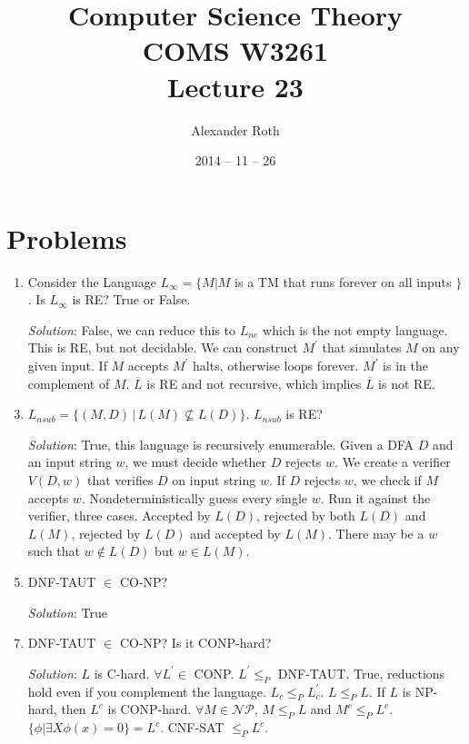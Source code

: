 \documentclass[]{article}
\begin{document}
\newtheorem{thm}{Theorem}
\title{Computer Science Theory \\ COMS W3261 \\ Lecture 23}
\author{Alexander Roth}
\date{2014 -- 11 -- 26}
\maketitle

\section*{Problems}
\begin{enumerate}
\item Consider the Language $L_\infty = \{ M | M$ is a TM that runs forever on all inputs $\}$. Is $L_\infty$ is RE? True or False. 
\item[\emph{Solution}:] False, we can reduce this to $L_{ne}$ which is the not empty language. This is RE, but not decidable. We can construct $M^\prime$ that simulates $M$ on any given input. If $M$ accepts $M^\prime$ halts, otherwise loops forever. $M^\prime$ is in the complement of $M$. $\overline{L}$ is RE and not recursive, which implies $\overline{L}$ is not RE.

\item $L_{nsub} = \{ (M, D)\,|\,L(M)\nsubseteq L(D) \}$. $L_{nsub}$ is RE?
\item[\emph{Solution}:] True, this language is recursively enumerable. Given a DFA $D$ and an input string $w$, we must decide whether $D$ rejects $w$. We create a verifier $V(D,w)$ that verifies $D$ on input string $w$. If $D$ rejects $w$, we check if $M$ accepts $w$. Nondeterministically guess every single $w$. Run it against the verifier, three cases. Accepted by $L(D)$, rejected by both $L(D)$ and $L(M)$, rejected by $L(D)$ and accepted by $L(M)$.  There may be a $w$ such that $w \not\in L(D)$ but $w \in L(M)$.

\item DNF-TAUT $\in$ CO-NP?
\item[\emph{Solution}:] True

\item DNF-TAUT $\in$ CO-NP? Is it CONP-hard?
\item[\emph{Solution}:] $L$ is C-hard. $\forall L^\prime \in$ CONP. $L^\prime \leq_P$ DNF-TAUT. True, reductions hold even if you complement the language. $L_c \leq_P L^\prime_c$. $L \leq_P L$. If $L$ is NP-hard, then $L^c$ is CONP-hard. $\forall M \in \mathcal{NP}$, $M \leq_P L$ and $M^c \leq_P L^c$. $\{\phi|\exists X \phi(x) = 0\} = L^c$. CNF-SAT $\leq_P L^c$.


\end{enumerate}
\end{document}
